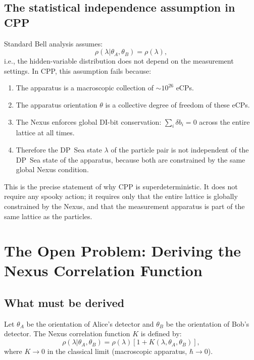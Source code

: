 \documentclass[11pt,letterpaper]{article}
\begin{document}
\subsection{The statistical independence assumption in CPP}

Standard Bell analysis assumes:
\begin{equation}
\rho(\lambda | \theta_A, \theta_B) = \rho(\lambda),
\label{eq:stat_indep}
\end{equation}
i.e., the hidden-variable distribution does not depend on the
measurement settings.  In CPP, this assumption fails because:

\begin{enumerate}
\item The apparatus is a macroscopic collection of $\sim 10^{26}$ eCPs.
\item The apparatus orientation $\theta$ is a collective degree of
  freedom of these eCPs.
\item The Nexus enforces global DI-bit conservation:
  $\sum_{i} \delta b_i = 0$ across the entire lattice at all times.
\item Therefore the DP~Sea state $\lambda$ of the particle pair is
  not independent of the DP~Sea state of the apparatus, because both
  are constrained by the same global Nexus condition.
\end{enumerate}

This is the precise statement of why CPP is superdeterministic.  It
does not require any spooky action; it requires only that the entire
lattice is globally constrained by the Nexus, and that the
measurement apparatus is part of the same lattice as the particles.

\section{The Open Problem: Deriving the Nexus Correlation Function}
\label{sec:openprob}

\subsection{What must be derived}

Let $\theta_A$ be the orientation of Alice's detector and $\theta_B$
be the orientation of Bob's detector.  The Nexus correlation function
$K$ is defined by:
\begin{equation}
\rho(\lambda | \theta_A, \theta_B)
= \rho(\lambda)\left[1 + K(\lambda, \theta_A, \theta_B)\right],
\label{eq:nexus_corr}
\end{equation}
where $K \to 0$ in the classical limit (macroscopic apparatus,
$\hbar \to 0$).
\end{document}
